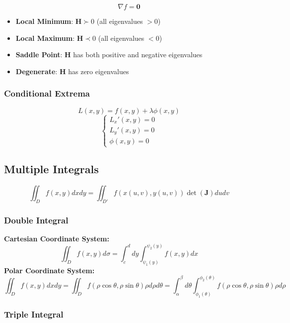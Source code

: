 \documentclass{article}
\begin{document}
\[
    \nabla f = \mathbf{0}
\]

\begin{itemize}
    \item \textbf{Local Minimum}: $\mathbf{H} \succ 0$ (all eigenvalues $> 0$)
    \item \textbf{Local Maximum}: $\mathbf{H} \prec 0$ (all eigenvalues $< 0$)
    \item \textbf{Saddle Point}: $\mathbf{H}$ has both positive and negative eigenvalues
    \item \textbf{Degenerate}: $\mathbf{H}$ has zero eigenvalues
\end{itemize}

\subsubsection{Conditional Extrema}

\[
    L(x, y) = f(x, y) + \lambda \phi(x, y)
\]
\[
    \begin{cases}
        L_x'(x, y) = 0 \\
        L_y'(x, y) = 0 \\
        \phi(x, y) = 0
    \end{cases}
\]

\subsection{Multiple Integrals}

\[
    \iint_D f(x, y) dx dy = \iint_{D'} f(x(u, v), y(u, v)) \det(\mathbf{J}) du dv
\]

\subsubsection{Double Integral}

\textbf{Cartesian Coordinate System:}
\[
    \iint_D f(x, y) d\sigma = \int_c^d dy \int_{\psi_1(y)}^{\psi_2(y)} f(x, y) dx
\]
\textbf{Polar Coordinate System:}
\[
    \iint_D f(x, y) dx dy = \iint_D f(\rho \cos \theta, \rho \sin \theta) \rho d\rho d\theta = \int_\alpha^\beta d\theta \int_{\phi_1(\theta)}^{\phi_2(\theta)} f(\rho \cos \theta, \rho \sin \theta) \rho d\rho
\]

\subsubsection{Triple Integral}
\end{document}
